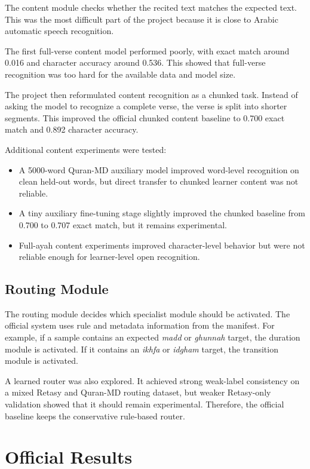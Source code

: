 \documentclass[12pt,a4paper]{report}
\begin{document}
The content module checks whether the recited text matches the expected text.
This was the most difficult part of the project because it is close to Arabic
automatic speech recognition.

The first full-verse content model performed poorly, with exact match around
0.016 and character accuracy around 0.536. This showed that full-verse
recognition was too hard for the available data and model size.

The project then reformulated content recognition as a chunked task. Instead of
asking the model to recognize a complete verse, the verse is split into shorter
segments. This improved the official chunked content baseline to 0.700 exact
match and 0.892 character accuracy.

Additional content experiments were tested:

\begin{itemize}[leftmargin=*]
    \item A 5000-word Quran-MD auxiliary model improved word-level recognition
    on clean held-out words, but direct transfer to chunked learner content was
    not reliable.
    \item A tiny auxiliary fine-tuning stage slightly improved the chunked
    baseline from 0.700 to 0.707 exact match, but it remains experimental.
    \item Full-ayah content experiments improved character-level behavior but
    were not reliable enough for learner-level open recognition.
\end{itemize}

\subsection{Routing Module}

The routing module decides which specialist module should be activated. The
official system uses rule and metadata information from the manifest. For
example, if a sample contains an expected \textit{madd} or \textit{ghunnah}
target, the duration module is activated. If it contains an \textit{ikhfa} or
\textit{idgham} target, the transition module is activated.

A learned router was also explored. It achieved strong weak-label consistency
on a mixed Retasy and Quran-MD routing dataset, but weaker Retasy-only
validation showed that it should remain experimental. Therefore, the official
baseline keeps the conservative rule-based router.

\section{Official Results}
\end{document}
